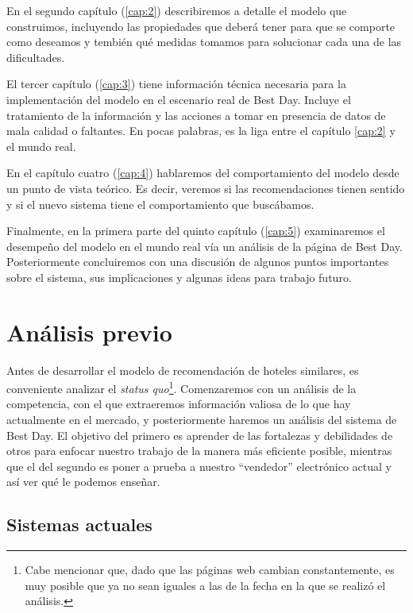\documentclass[12pt]{report}
\begin{document}
En el segundo capítulo (\ref{cap:2}) describiremos a detalle el modelo que construimos, incluyendo las propiedades que deberá tener para que se comporte como deseamos y tembién qué medidas tomamos para solucionar cada una de las dificultades.

El tercer capítulo (\ref{cap:3}) tiene información técnica necesaria para la implementación del modelo en el escenario real de Best Day. Incluye el tratamiento de la información y las acciones a tomar en presencia de datos de mala calidad o faltantes. En pocas palabras, es la liga entre el capítulo \ref{cap:2} y el mundo real.

En el capítulo cuatro (\ref{cap:4}) hablaremos del comportamiento del modelo desde un punto de vista teórico. Es decir, veremos si las recomendaciones tienen sentido y si el nuevo sistema tiene el comportamiento que buscábamos.

Finalmente, en la primera parte del quinto capítulo (\ref{cap:5}) examinaremos el desempeño del modelo en el mundo real vía un análisis de la página de Best Day. Posteriormente concluiremos con una discusión de algunos puntos importantes sobre el sistema, sus implicaciones y algunas ideas para trabajo futuro.

\chapter{Análisis previo} \label{cap:1}

Antes de desarrollar el modelo de recomendación de hoteles similares, es conveniente analizar el \emph{status quo}\footnote{Cabe mencionar que, dado que las páginas web cambian constantemente, es muy posible que ya no sean iguales a las de la fecha en la que se realizó el análisis.}. Comenzaremos con un análisis de la competencia, con el que extraeremos información valiosa de lo que hay actualmente en el mercado, y posteriormente haremos un análisis del sistema de Best Day. El objetivo del primero es aprender de las fortalezas y debilidades de otros para enfocar nuestro trabajo de la manera más eficiente posible, mientras que el del segundo es poner a prueba a nuestro ``vendedor'' electrónico actual y así ver qué le podemos enseñar.

\section{Sistemas actuales}
\end{document}
